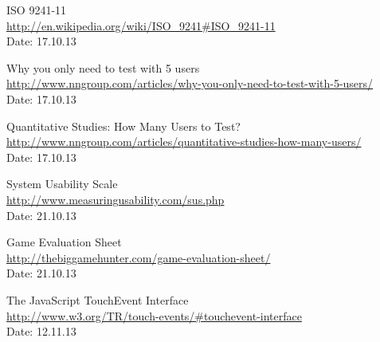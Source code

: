 \begin{thebibliography}{99}
	ISO 9241-11 \\
	\href {http://en.wikipedia.org/wiki/ISO_9241#ISO_9241-11}{http://en.wikipedia.org/wiki/ISO\_9241\#ISO\_9241-11} \\
	Date: 17.10.13

	Why you only need to test with 5 users \\
	\href {http://www.nngroup.com/articles/why-you-only-need-to-test-with-5-users/}{http://www.nngroup.com/articles/why-you-only-need-to-test-with-5-users/} \\
	Date: 17.10.13

	Quantitative Studies: How Many Users to Test? \\
	\href {http://www.nngroup.com/articles/quantitative-studies-how-many-users/}{http://www.nngroup.com/articles/quantitative-studies-how-many-users/} \\
	Date: 17.10.13

	System Usability Scale \\
	\href {http://www.measuringusability.com/sus.php}{http://www.measuringusability.com/sus.php} \\
	Date: 21.10.13 

	Game Evaluation Sheet \\
	\href {http://thebiggamehunter.com/game-evaluation-sheet/}{http://thebiggamehunter.com/game-evaluation-sheet/} \\
	Date: 21.10.13

  The JavaScript TouchEvent Interface \\
  \href {http://www.w3.org/TR/touch-events/\#touchevent-interface}{http://www.w3.org/TR/touch-events/\#touchevent-interface} \\
  Date: 12.11.13

\end{thebibliography}
